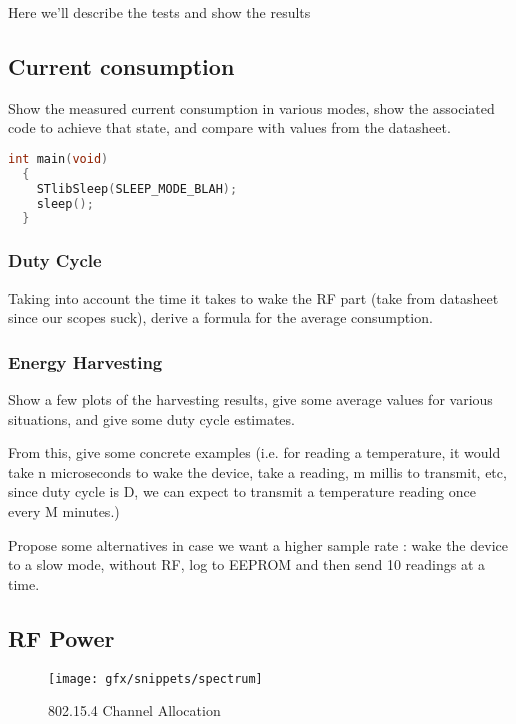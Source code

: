 Here we'll describe the tests and show the results

\subsection{Current consumption}

Show the measured current consumption in various modes, show the associated code
to achieve that state, and compare with values from the datasheet.

\begin{lstlisting}[language=C,caption=Example code for sleep mode A]
  int main(void)
  {
    STlibSleep(SLEEP_MODE_BLAH);
    sleep();
  }
\end{lstlisting}

\subsubsection{Duty Cycle}

Taking into account the time it takes to wake the RF part (take from datasheet
since our scopes suck), derive a formula for the average consumption.

\subsubsection{Energy Harvesting}

Show a few plots of the harvesting results, give some average values for various
situations, and give some duty cycle estimates.

From this, give some concrete examples (i.e. for reading a temperature, it would
take n microseconds to wake the device, take a reading, m millis to transmit,
etc, since duty cycle is D, we can expect to transmit a temperature reading once
every M minutes.)

Propose some alternatives in case we want a higher sample rate : wake the device
to a slow mode, without RF, log to EEPROM and then send 10 readings at a time.

\subsection{RF Power}


\begin{figure}[htb]
  \begin{center}
    \texttt{[image: gfx/snippets/spectrum]}
  \end{center}
  \caption{802.15.4 Channel Allocation\citep{hunn2010}}
  \label{fig:channel-allocation}
\end{figure}

